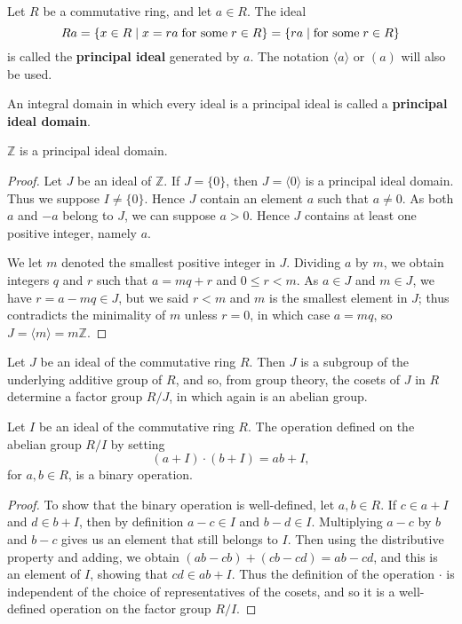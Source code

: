 \documentclass[graybox, reqno]{svmono}
\newcommand{\zz}{\mathbb Z}
\begin{document}
\begin{definition} Let $R$ be a commutative ring, and let $a \in R$. The ideal \[ Ra = \{ x \in R \mid x = ra \; \textup{for some} \; r \in R\} = \{ ra \mid  \textup{for some} \; r \in R \} \] is called the \textup{\textbf{principal ideal}} generated by $a$. The notation $\langle a \rangle$ or $( a )$ will also be used.

An integral domain in which every ideal is a principal ideal is called a \textup{\textbf{principal ideal domain}}. 
\end{definition} 
\begin{theorem} $\zz$ is a principal ideal domain.
\end{theorem}
\begin{proof} Let $J$ be an ideal of $\zz$. If $J = \{ 0 \}$, then $J = \langle 0 \rangle$ is a principal ideal domain. Thus we suppose $ I \neq \{ 0 \}$. Hence $J$ contain an element $a$ such that $a \neq 0$. As both $a$ and $-a$ belong to $J$, we can suppose $a >0$. Hence $J$ contains at least one positive integer, namely $a$. 


We let $m$ denoted the smallest positive integer in $J$. Dividing $a$ by $m$, we obtain integers $q$ and $r$ such that $a = mq + r$ and $0 \leq r < m$. As $a \in J$ and $m \in J$, we have $r = a - mq \in J$, but we said $r < m$ and $m$ is the smallest element in $J$; thus contradicts the minimality of $m$ unless $r = 0$, in which case $a = mq$, so $J = \langle m \rangle = m \zz$. 
\end{proof}


Let $J$ be an ideal of the commutative ring $R$. Then $J$ is a subgroup of the underlying additive group of $R$, and so, from group theory, the cosets of $J$ in $R$ determine a factor group $R/J$, in which again is an abelian group. 
\begin{proposition} Let $I$ be an ideal of the commutative ring $R$. The operation defined on the abelian group $R/I$ by setting \[ (a+I) \cdot (b+I) = ab + I, \] for $a, b \in R$, is a binary operation.
\end{proposition} 
\begin{proof} To show that the binary operation is well-defined, let $a, b \in R$. If $c \in a+I$ and $d \in b+I$, then by definition $a-c \in I$ and $b-d \in I$. Multiplying $a-c$ by $b$ and $b-c$ gives us an element that still belongs to $I$. Then using the distributive property and adding, we obtain $(ab-cb)+(cb-cd) = ab-cd$, and this is an element of $I$, showing that $cd \in ab+I$. Thus the definition of the operation $\cdot$ is independent of the choice of representatives of the cosets, and so it is a well-defined operation on the factor group $R/I$. 
\end{proof}
\end{document}
